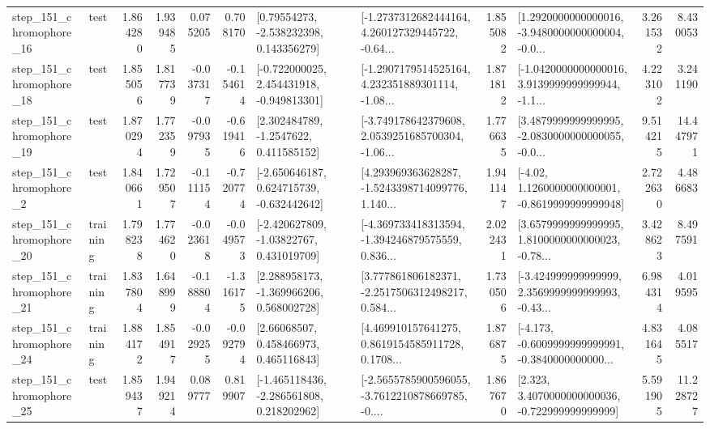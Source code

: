 \begin{tabular}{llrrrrllrlrr}
  step\_151\_chromophore\_16 &      test &      1.864280 &    1.939485 &      0.075205 &  0.708170 &     [0.79554273, -2.538232398, 0.143356279] &  [-1.2737312682444164, 4.260127329445722, -0.64... &       1.855082 &  [1.2920000000000016, -3.9480000000000004, -0.0... &            3.261532 &          8.430053 \\
  step\_151\_chromophore\_18 &      test &      1.855056 &    1.817739 &     -0.037317 & -0.154614 &   [-0.722000025, 2.454431918, -0.949813301] &  [-1.2907179514525164, 4.232351889301114, -1.08... &       1.871812 &  [-1.0420000000000016, 3.9139999999999944, -1.1... &            4.223102 &          3.241190 \\
  step\_151\_chromophore\_19 &      test &      1.870294 &    1.772359 &     -0.097935 & -0.619416 &      [2.302484789, -1.2547622, 0.411585152] &  [-3.749178642379608, 2.0539251685700304, -1.06... &       1.776635 &  [3.4879999999999995, -2.0830000000000055, -0.0... &            9.514215 &         14.447971 \\
   step\_151\_chromophore\_2 &      test &      1.840661 &    1.729507 &     -0.111154 & -0.720774 &   [-2.650646187, 0.624715739, -0.632442642] &  [4.293969363628287, -1.5243398714099776, 1.140... &       1.941147 &   [-4.02, 1.1260000000000001, -0.8619999999999948] &            2.722630 &          4.486683 \\
  step\_151\_chromophore\_20 &  training &      1.798238 &    1.774620 &     -0.023618 & -0.049573 &    [-2.420627809, -1.03822767, 0.431019709] &  [-4.369733418313594, -1.394246879575559, 0.836... &       2.022431 &  [3.6579999999999995, 1.8100000000000023, -0.78... &            3.428623 &          8.497591 \\
  step\_151\_chromophore\_21 &  training &      1.837804 &    1.648999 &     -0.188804 & -1.316175 &    [2.288958173, -1.369966206, 0.568002728] &  [3.777861806182371, -2.2517506312498217, 0.584... &       1.730506 &  [-3.424999999999999, 2.3569999999999993, -0.43... &            6.984314 &          4.019595 \\
  step\_151\_chromophore\_24 &  training &      1.884172 &    1.854917 &     -0.029255 & -0.092794 &      [2.66068507, 0.458466973, 0.465116843] &  [4.469910157641275, 0.8619154585911728, 0.1708... &       1.876875 &  [-4.173, -0.6009999999999991, -0.3840000000000... &            4.831645 &          4.085517 \\
  step\_151\_chromophore\_25 &      test &      1.859437 &    1.949214 &      0.089777 &  0.819907 &   [-1.465118436, -2.286561808, 0.218202962] &  [-2.5655785900596055, -3.7612210878669785, -0.... &       1.867670 &    [2.323, 3.4070000000000036, -0.722999999999999] &            5.591905 &         11.228727 \\

\end{tabular}
